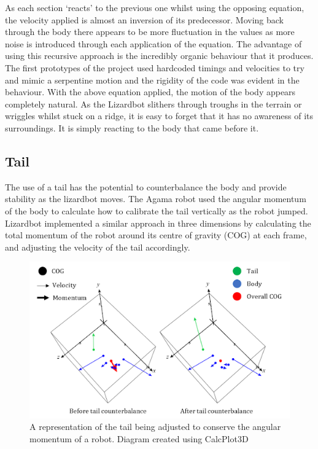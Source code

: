 \documentclass{article}
\begin{document}
As each section ‘reacts’ to the previous one whilst using the opposing equation, the velocity applied is almost an inversion of its predecessor. Moving back through the body there appears to be more fluctuation in the values as more noise is introduced through each application of the equation. The advantage of using this recursive approach is the incredibly organic behaviour that it produces. The first prototypes of the project used hardcoded timings and velocities to try and mimic a serpentine motion and the rigidity of the code was evident in the behaviour. With the above equation applied, the motion of the body appears completely natural. As the Lizardbot slithers through troughs in the terrain or wriggles whilst stuck on a ridge, it is easy to forget that it has no awareness of its surroundings. It is simply reacting to the body that came before it.


\subsection{Tail}
The use of a tail has the potential to counterbalance the body and provide stability as the lizardbot moves. The Agama robot used the angular momentum of the body to calculate how to calibrate the tail vertically as the robot jumped. Lizardbot implemented a similar approach in three dimensions by calculating the total momentum of the robot around its centre of gravity (COG) at each frame, and adjusting the velocity of the tail accordingly.\\ 
\begin{figure}[h]
\centering
\includegraphics[scale=0.6]{tailMomentum}
\caption{A representation of the tail being adjusted to conserve the angular momentum of a robot. Diagram created using CalcPlot3D \citep{diagrams}}
\end{figure}
\end{document}
